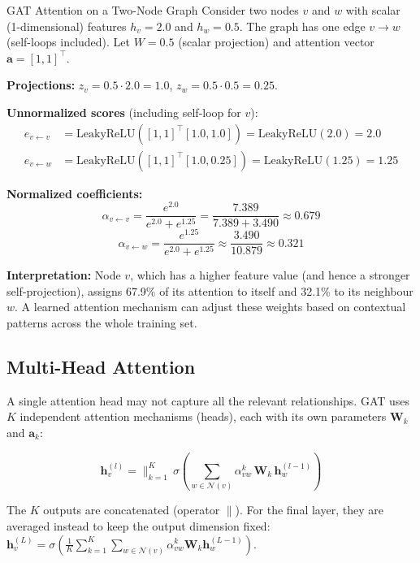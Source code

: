 \begin{examplebox}{GAT Attention on a Two-Node Graph}
Consider two nodes $v$ and $w$ with scalar (1-dimensional) features $h_v = 2.0$ and $h_w = 0.5$. The graph has one edge $v \to w$ (self-loops included). Let $W = 0.5$ (scalar projection) and attention vector $\mathbf{a} = [1, 1]^\top$.

\textbf{Projections:} $z_v = 0.5 \cdot 2.0 = 1.0$, $z_w = 0.5 \cdot 0.5 = 0.25$.

\textbf{Unnormalized scores} (including self-loop for $v$):
\begin{align*}
    e_{v \leftarrow v} &= \text{LeakyReLU}([1,1]^\top [1.0, 1.0]) = \text{LeakyReLU}(2.0) = 2.0 \\
    e_{v \leftarrow w} &= \text{LeakyReLU}([1,1]^\top [1.0, 0.25]) = \text{LeakyReLU}(1.25) = 1.25
\end{align*}

\textbf{Normalized coefficients:}
\[
\alpha_{v \leftarrow v} = \frac{e^{2.0}}{e^{2.0} + e^{1.25}} = \frac{7.389}{7.389 + 3.490} \approx 0.679
\]
\[
\alpha_{v \leftarrow w} = \frac{e^{1.25}}{e^{2.0} + e^{1.25}} \approx \frac{3.490}{10.879} \approx 0.321
\]

\textbf{Interpretation:} Node $v$, which has a higher feature value (and hence a stronger self-projection), assigns 67.9\% of its attention to itself and 32.1\% to its neighbour $w$. A learned attention mechanism can adjust these weights based on contextual patterns across the whole training set.
\end{examplebox}

\subsection{Multi-Head Attention}

A single attention head may not capture all the relevant relationships. GAT uses $K$ independent attention mechanisms (heads), each with its own parameters $\mathbf{W}_k$ and $\mathbf{a}_k$:

\begin{equation}
    \mathbf{h}_v^{(l)} = \Big\|_{k=1}^{K}\, \sigma\!\left(\sum_{w \in \mathcal{N}(v)} \alpha_{vw}^k\, \mathbf{W}_k\, \mathbf{h}_w^{(l-1)}\right)
    \label{eq:gat_multihead}
\end{equation}

The $K$ outputs are concatenated (operator $\|$). For the final layer, they are averaged instead to keep the output dimension fixed:
$\mathbf{h}_v^{(L)} = \sigma\!\left(\frac{1}{K}\sum_{k=1}^K \sum_{w \in \mathcal{N}(v)} \alpha_{vw}^k \mathbf{W}_k \mathbf{h}_w^{(L-1)}\right)$.

